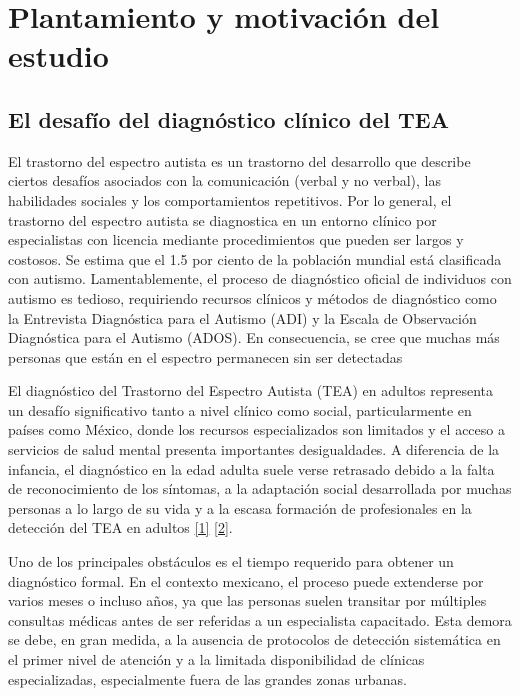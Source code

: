 
\section{Plantamiento y motivación del estudio}
\subsection{El desafío del diagnóstico clínico del TEA}
El trastorno del espectro autista es un trastorno del desarrollo que describe ciertos desafíos asociados con la comunicación (verbal y no verbal), las habilidades sociales y los comportamientos repetitivos. Por lo general, el trastorno del espectro autista se diagnostica en un entorno clínico por especialistas con licencia mediante procedimientos que pueden ser largos y costosos. Se estima que el 1.5 por ciento de la población mundial está clasificada con autismo. Lamentablemente, el proceso de diagnóstico oficial de individuos con autismo es tedioso, requiriendo recursos clínicos y métodos de diagnóstico como la Entrevista Diagnóstica para el Autismo (ADI) y la Escala de Observación Diagnóstica para el Autismo (ADOS). En consecuencia, se cree que muchas más personas que están en el espectro permanecen sin ser detectadas

El diagnóstico del Trastorno del Espectro Autista (TEA) en adultos representa un desafío significativo tanto a nivel clínico como social, particularmente en países como México, donde los recursos especializados son limitados y el acceso a servicios de salud mental presenta importantes desigualdades. A diferencia de la infancia, el diagnóstico en la edad adulta suele verse retrasado debido a la falta de reconocimiento de los síntomas, a la adaptación social desarrollada por muchas personas a lo largo de su vida y a la escasa formación de profesionales en la detección del TEA en adultos \hyperlink{1}{[1]} \hyperlink{2}{[2]}.

Uno de los principales obstáculos es el tiempo requerido para obtener un diagnóstico formal. En el contexto mexicano, el proceso puede extenderse por varios meses o incluso años, ya que las personas suelen transitar por múltiples consultas médicas antes de ser referidas a un especialista capacitado. Esta demora se debe, en gran medida, a la ausencia de protocolos de detección sistemática en el primer nivel de atención y a la limitada disponibilidad de clínicas especializadas, especialmente fuera de las grandes zonas urbanas.

